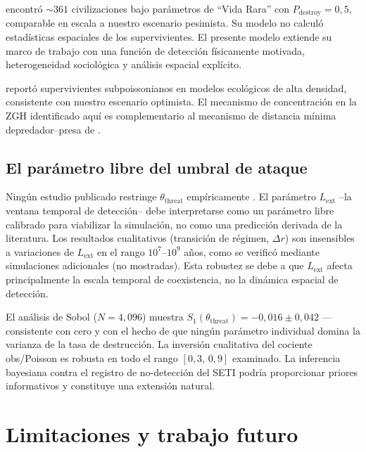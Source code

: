 \documentclass[11pt,a4paper,onecolumn]{article}
\begin{document}
\citet{forgan2009} encontró $\sim 361$ civilizaciones bajo parámetros
de ``Vida Rara'' con $P_\text{destroy} = 0{,}5$, comparable en escala
a nuestro escenario pesimista.
Su modelo no calculó estadísticas espaciales de los supervivientes.
El presente modelo extiende su marco de trabajo con una función de
detección físicamente motivada, heterogeneidad sociológica y análisis
espacial explícito.

\citet{foucher2023} reportó supervivientes subpoissonianos en modelos
ecológicos de alta densidad, consistente con nuestro escenario
optimista.
El mecanismo de concentración en la ZGH identificado aquí es
complementario al mecanismo de distancia mínima depredador--presa de
\citet{foucher2023}.

\subsection{El parámetro libre del umbral de ataque}

Ningún estudio publicado restringe $\theta_\text{threat}$
empíricamente \citep{devladar2013}.
El parámetro $L_\text{ext}$ --la ventana temporal de detección--
debe interpretarse como un parámetro libre calibrado para viabilizar
la simulación, no como una predicción derivada de la literatura. Los
resultados cualitativos (transición de régimen, $\Delta r$) son
insensibles a variaciones de $L_\text{ext}$ en el rango $10^7$--$10^9$
años, como se verificó mediante simulaciones adicionales (no mostradas).
Esta robustez se debe a que $L_\text{ext}$ afecta principalmente la
escala temporal de coexistencia, no la dinámica espacial de detección.

El análisis de Sobol ($N = 4{,}096$) muestra
$S_1(\theta_\text{threat}) = -0{,}016 \pm 0{,}042$ — consistente con
cero y con el hecho de que ningún parámetro individual domina la
varianza de la tasa de destrucción.
La inversión cualitativa del cociente obs/Poisson es robusta en todo
el rango $[0{,}3,\,0{,}9]$ examinado.
La inferencia bayesiana contra el registro de no-detección del SETI
podría proporcionar priores informativos y constituye una extensión
natural.

\section{Limitaciones y trabajo futuro}
\label{sec:limitations}
\end{document}

